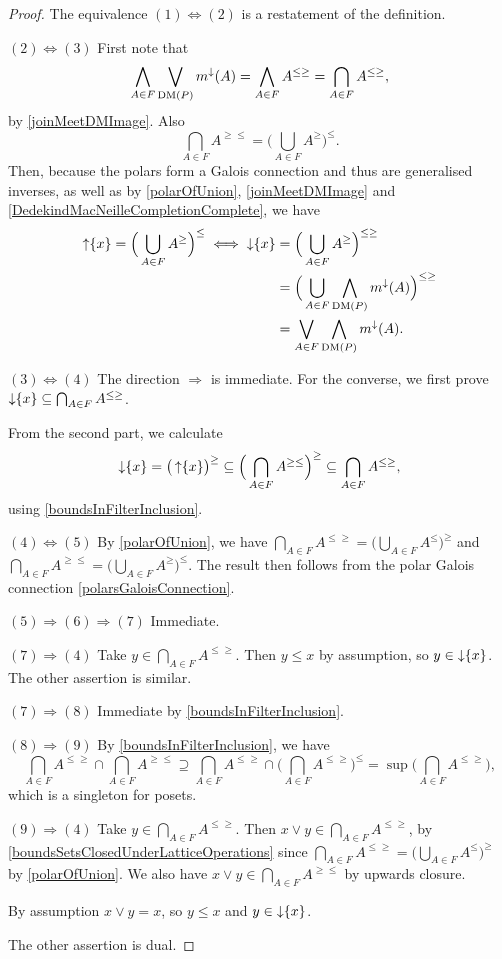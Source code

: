 \begin{proof}
The equivalence $(1) \Leftrightarrow (2)$ is a restatement of the definition.

$(2) \Leftrightarrow (3)$ First note that
\[ \bigwedge_{A\in F}\bigvee_{\operatorname{DM}(P)} m^\downarrow(A) = \bigwedge_{A\in F}A^{\leq\geq} = \bigcap_{A\in F}A^{\leq\geq}, \]
by \ref{joinMeetDMImage}. Also
\[ \bigcap_{A\in F}A^{\geq\leq} = \Big(\bigcup_{A\in F}A^\geq\Big)^\leq. \]
Then, because the polars form a Galois connection and thus are generalised inverses, as well as by \ref{polarOfUnion}, \ref{joinMeetDMImage} and \ref{DedekindMacNeilleCompletionComplete}, we have
\begin{align*}
\operatorname{\uparrow}\{x\} = \Big(\bigcup_{A\in F}A^\geq\Big)^\leq \iff \operatorname{\downarrow}\{x\} &= \Big(\bigcup_{A\in F}A^\geq\Big)^{\leq\geq} \\
&= \Big(\bigcup_{A\in F}\bigwedge_{\operatorname{DM}(P)}m^\downarrow(A)\Big)^{\leq\geq} \\
&= \bigvee_{A\in F}\bigwedge_{\operatorname{DM}(P)} m^\downarrow(A).
\end{align*}

$(3) \Leftrightarrow (4)$ The direction $\Rightarrow$ is immediate. For the converse, we first prove $\operatorname{\downarrow} \{x\}\subseteq \bigcap_{A\in F}A^{\leq \geq}$.

From the second part, we calculate
\[ \operatorname{\downarrow}\{x\} = \big(\operatorname{\uparrow}\{x\}\big)^\geq \subseteq \Big(\bigcap_{A\in F}A^{\geq\leq}\Big)^\geq \subseteq \bigcap_{A\in F}A^{\leq\geq}, \]
using \ref{boundsInFilterInclusion}.

$(4) \Leftrightarrow (5)$ By \ref{polarOfUnion}, we have $\bigcap_{A\in F}A^{\leq \geq} = \Big(\bigcup_{A\in F}A^{\leq}\Big)^\geq$ and $\bigcap_{A\in F}A^{\geq \leq} = \Big(\bigcup_{A\in F}A^{\geq}\Big)^\leq$. The result then follows from the polar Galois connection \ref{polarsGaloisConnection}.

$(5) \Rightarrow (6) \Rightarrow (7)$ Immediate.

$(7) \Rightarrow (4)$ Take $y\in \bigcap_{A\in F} A^{\leq \geq}$. Then $y\leq x$ by assumption, so $y\in \operatorname{\downarrow}\{x\}$. The other assertion is similar.

$(7) \Rightarrow (8)$ Immediate by \ref{boundsInFilterInclusion}.

$(8) \Rightarrow (9)$ By \ref{boundsInFilterInclusion}, we have
\[ \bigcap_{A\in F}A^{\leq \geq} \cap \bigcap_{A\in F}A^{\geq\leq} \supseteq \bigcap_{A\in F}A^{\leq \geq} \cap \Big(\bigcap_{A\in F}A^{\leq\geq}\Big)^{\leq} = \sup\Big(\bigcap_{A\in F}A^{\leq\geq}\Big), \]
which is a singleton for posets.

$(9) \Rightarrow (4)$ Take $y\in \bigcap_{A\in F}A^{\leq \geq}$. Then $x\vee y\in \bigcap_{A\in F}A^{\leq \geq}$, by \ref{boundsSetsClosedUnderLatticeOperations} since $\bigcap_{A\in F}A^{\leq \geq} = \Big(\bigcup_{A\in F}A^{\leq}\Big)^\geq$ by \ref{polarOfUnion}. We also have $x\vee y \in \bigcap_{A\in F}A^{\geq\leq}$ by upwards closure.

By assumption $x\vee y = x$, so $y\leq x$ and $y\in \operatorname{\downarrow}\{x\}$.

The other assertion is dual.
\end{proof}

